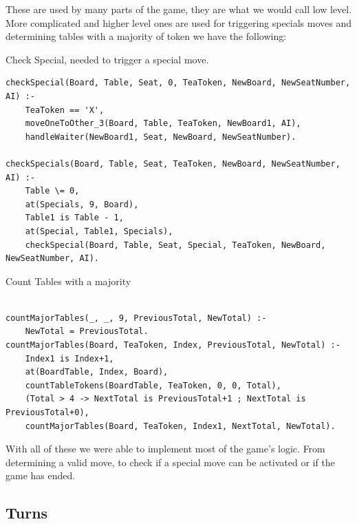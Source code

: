 \documentclass[a4paper]{article}
\begin{document}
These are used by many parts of the game, they are what we would call low level.
More complicated and higher level ones are used for triggering specials moves and determining tables
with a majority of token we have the following:

        \begin{listing}[H]
        \caption{Check Special, needed to trigger a special move.}
        \label{Codigo:cod_chekspecial}
        \begin{verbatim}
checkSpecial(Board, Table, Seat, 0, TeaToken, NewBoard, NewSeatNumber, AI) :-
    TeaToken == 'X',
    moveOneToOther_3(Board, Table, TeaToken, NewBoard1, AI),
    handleWaiter(NewBoard1, Seat, NewBoard, NewSeatNumber).

checkSpecials(Board, Table, Seat, TeaToken, NewBoard, NewSeatNumber, AI) :-
    Table \= 0,
    at(Specials, 9, Board),
    Table1 is Table - 1,
    at(Special, Table1, Specials),
    checkSpecial(Board, Table, Seat, Special, TeaToken, NewBoard, NewSeatNumber, AI).
        \end{verbatim}

        \end{listing}

        \begin{listing}[H]
        \caption{Count Tables with a majority}
        \label{Codigo:cod_major}
        \begin{verbatim}

countMajorTables(_, _, 9, PreviousTotal, NewTotal) :-
    NewTotal = PreviousTotal.
countMajorTables(Board, TeaToken, Index, PreviousTotal, NewTotal) :-
    Index1 is Index+1,
    at(BoardTable, Index, Board),
    countTableTokens(BoardTable, TeaToken, 0, 0, Total),
    (Total > 4 -> NextTotal is PreviousTotal+1 ; NextTotal is PreviousTotal+0),
    countMajorTables(Board, TeaToken, Index1, NextTotal, NewTotal).

        \end{verbatim}

        \end{listing}


With all of these we were able to implement most of the game's logic. From determining a valid move,
to check if a special move can be activated or if the game has ended.


\subsection{Turns}
\end{document}
